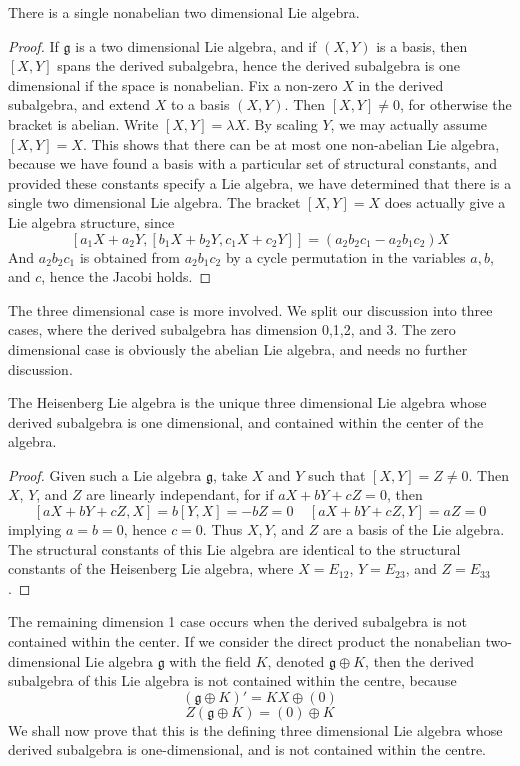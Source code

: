 \begin{theorem}
    There is a single nonabelian two dimensional Lie algebra.
\end{theorem}
\begin{proof}
    If $\mathfrak{g}$ is a two dimensional Lie algebra, and if $(X,Y)$ is a basis, then $[X,Y]$ spans the derived subalgebra, hence the derived subalgebra is one dimensional if the space is nonabelian. Fix a non-zero $X$ in the derived subalgebra, and extend $X$ to a basis $(X,Y)$. Then $[X,Y] \neq 0$, for otherwise the bracket is abelian. Write $[X,Y] = \lambda X$. By scaling $Y$, we may actually assume $[X,Y] = X$. This shows that there can be at most one non-abelian Lie algebra, because we have found a basis with a particular set of structural constants, and provided these constants specify a Lie algebra, we have determined that there is a single two dimensional Lie algebra. The bracket $[X,Y] = X$ does actually give a Lie algebra structure, since
    \[ [a_1X + a_2Y, [b_1X + b_2Y, c_1X + c_2Y]] = (a_2b_2c_1 - a_2b_1c_2) X \]
    And $a_2b_2c_1$ is obtained from $a_2b_1c_2$ by a cycle permutation in the variables $a,b$, and $c$, hence the Jacobi holds.
\end{proof}

The three dimensional case is more involved. We split our discussion into three cases, where the derived subalgebra has dimension 0,1,2, and 3. The zero dimensional case is obviously the abelian Lie algebra, and needs no further discussion.

\begin{theorem}
    The Heisenberg Lie algebra is the unique three dimensional Lie algebra whose derived subalgebra is one dimensional, and contained within the center of the algebra.
\end{theorem}
\begin{proof}
    Given such a Lie algebra $\mathfrak{g}$, take $X$ and $Y$ such that $[X,Y] = Z \neq 0$. Then $X$, $Y$, and $Z$ are linearly independant, for if $aX + bY + cZ = 0$, then
    \[ [aX + bY + cZ, X] = b[Y,X] = -bZ = 0\ \ \ \ \ [aX + bY + cZ, Y] = aZ = 0 \]
    implying $a = b = 0$, hence $c = 0$. Thus $X,Y$, and $Z$ are a basis of the Lie algebra. The structural constants of this Lie algebra are identical to the structural constants of the Heisenberg Lie algebra, where $X = E_{12}$, $Y = E_{23}$, and $Z = E_{33}$.
\end{proof}

The remaining dimension 1 case occurs when the derived subalgebra is not contained within the center. If we consider the direct product the nonabelian two-dimensional Lie algebra $\mathfrak{g}$ with the field $K$, denoted $\mathfrak{g} \oplus K$, then the derived subalgebra of this Lie algebra is not contained within the centre, because
%
\[ (\mathfrak{g} \oplus K)' = KX \oplus (0) \]
\[ Z(\mathfrak{g} \oplus K) = (0) \oplus K \]
%
We shall now prove that this is the defining three dimensional Lie algebra whose derived subalgebra is one-dimensional, and is not contained within the centre.

